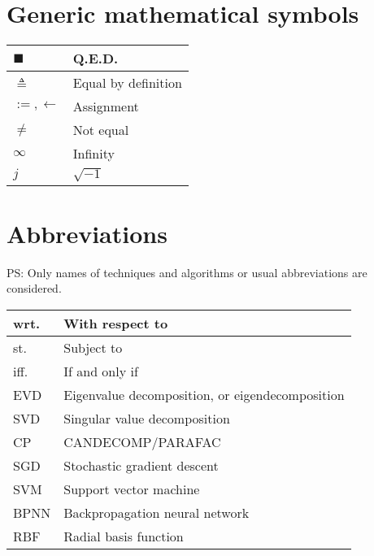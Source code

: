 \documentclass{article}
\begin{document}
\section{Generic mathematical symbols}
\begin{xltabular}{\textwidth}{XX}
    \(\blacksquare\) & Q.E.D. \\ \hline
    \(\triangleq\) & Equal by definition\\ \hline
    \(:=, \leftarrow\) & Assignment \cite{rosenDiscreteMathematicsIts2011}\\ \hline
    \(\neq\) & Not equal\\ \hline
    \(\infty\) & Infinity\\ \hline
    \(j\) & \(\sqrt{-1}\)\\
\end{xltabular}

\section{Abbreviations}
PS: Only names of techniques and algorithms or usual abbreviations are considered.
\begin{xltabular}{\textwidth}{XX}
    wrt. & With respect to\\ \hline
    st. & Subject to\\ \hline
    iff. & If and only if\\ \hline
    EVD & Eigenvalue decomposition, or eigendecomposition \cite{nossekAdaptiveArraySignal2015}\\ \hline
    SVD & Singular value decomposition\\ \hline
    CP & CANDECOMP/PARAFAC\\ \hline
    SGD & Stochastic gradient descent\\ \hline
    SVM & Support vector machine\\ \hline
    BPNN & Backpropagation neural network \cite{jiaoAutomaticEquatorialGPS2017}\\ \hline
    RBF & Radial basis function\\ \hline
\end{xltabular}

\printbibliography
\end{document}
